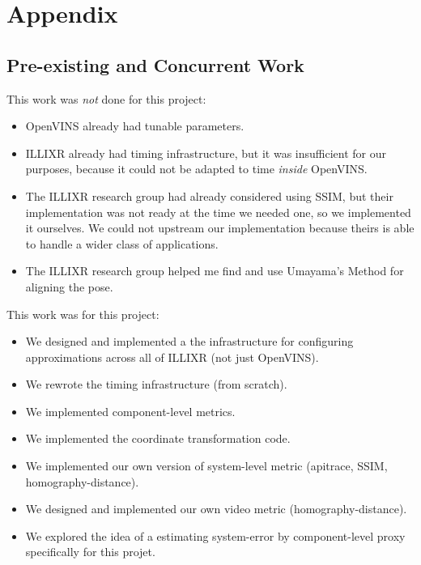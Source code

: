 \documentclass[screen,sigconf,nonacm]{acmart}
\begin{document}



\appendix
\section{Appendix}

\subsection{Pre-existing and Concurrent Work}
This work was \textit{not} done for this project:

\begin{itemize}
\item OpenVINS already had tunable parameters.
\item ILLIXR already had timing infrastructure, but it was insufficient for our purposes, because it could not be adapted to time \textit{inside} OpenVINS.
\item The ILLIXR research group had already considered using SSIM, but their implementation was not ready at the time we needed one, so we implemented it ourselves. We could not upstream our implementation because theirs is able to handle a wider class of applications.
\item The ILLIXR research group helped me find and use Umayama's Method for aligning the pose.
\end{itemize}

This work was for this project:

\begin{itemize}
\item We designed and implemented a the infrastructure for configuring approximations across all of ILLIXR (not just OpenVINS).
\item We rewrote the timing infrastructure (from scratch).
\item We implemented component-level metrics.
\item We implemented the coordinate transformation code.
\item We implemented our own version of system-level metric (apitrace, SSIM, homography-distance).
\item We designed and implemented our own video metric (homography-distance).
\item We explored the idea of a estimating system-error by component-level proxy specifically for this projet.
\end{itemize}
\end{document}
